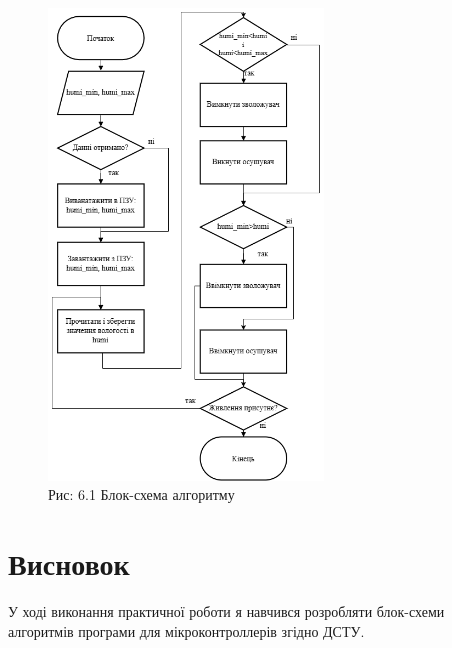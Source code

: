 \documentclass[a4paper]{article}
\begin{document}
\begin{figure}[h]
    \centering
    \includegraphics[width=0.65\textwidth]{imgs/PW6.drawio.png}
    \caption*{Рис: 6.1 Блок-схема алгоритму }
\end{figure}



\section*{Висновок}
У ході виконання практичної роботи я навчився  розробляти блок-схеми алгоритмів програми для мікроконтроллерів згідно ДСТУ.
\end{document}
